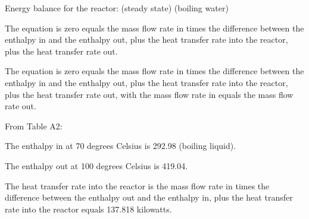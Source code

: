 Energy balance for the reactor: (steady state) (boiling water)

The equation is zero equals the mass flow rate in times the difference between the enthalpy in and the enthalpy out, plus the heat transfer rate into the reactor, plus the heat transfer rate out.

The equation is zero equals the mass flow rate in times the difference between the enthalpy in and the enthalpy out, plus the heat transfer rate into the reactor, plus the heat transfer rate out, with the mass flow rate in equals the mass flow rate out.

From Table A2:

The enthalpy in at 70 degrees Celsius is 292.98 (boiling liquid).

The enthalpy out at 100 degrees Celsius is 419.04.

The heat transfer rate into the reactor is the mass flow rate in times the difference between the enthalpy out and the enthalpy in, plus the heat transfer rate into the reactor equals 137.818 kilowatts.
